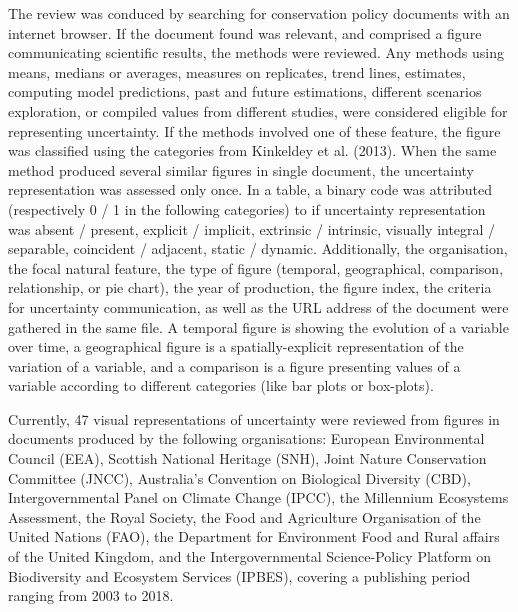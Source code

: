 \documentclass[12pt,a4paper]{article}
\begin{document}
The review was conduced by searching for conservation policy documents with an internet browser.
If the document found was relevant, and comprised a figure communicating scientific results, the methods were reviewed. %
Any methods using means, medians or averages, measures on replicates, trend lines, estimates, computing model predictions, past and future estimations, different scenarios exploration, or compiled values from different studies, were considered eligible for representing uncertainty.
If the methods involved one of these feature, the figure was classified using the categories from Kinkeldey et al. (2013).
When the same method produced several similar figures in single document, the uncertainty representation was assessed only once.
In a table, a binary code was attributed (respectively 0 / 1 in the following categories) to if uncertainty representation was absent / present, explicit / implicit, extrinsic / intrinsic, visually integral / separable, coincident / adjacent, static / dynamic.
Additionally, the organisation, the focal natural feature, the type of figure (temporal, geographical, comparison, relationship, or pie chart), the year of production, the figure index, the criteria for uncertainty communication, as well as the URL address of the document were gathered in the same file.
A temporal figure is showing the evolution of a variable over time, a geographical figure is a spatially-explicit representation of the variation of a variable, and a comparison is a figure presenting values of a variable according to different categories (like bar plots or box-plots).

Currently, 47 visual representations of uncertainty were reviewed from figures in documents produced by the following organisations: European Environmental Council (EEA), Scottish National Heritage (SNH), Joint Nature Conservation Committee (JNCC), Australia's Convention on Biological Diversity (CBD), Intergovernmental Panel on Climate Change (IPCC), the Millennium Ecosystems Assessment, the Royal Society, the Food and Agriculture Organisation of the United Nations (FAO), the Department for Environment Food and Rural affairs of the United Kingdom, and the Intergovernmental Science-Policy Platform on Biodiversity and Ecosystem Services (IPBES), covering a publishing period ranging from 2003 to 2018.%
\end{document}
